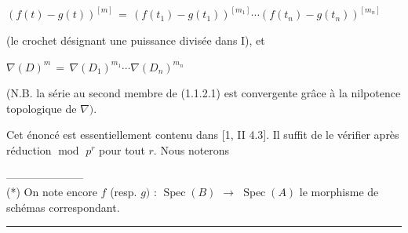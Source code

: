 \documentclass[9pt]{article}
\newcommand{\CanonText}[1]{\par{\fontsize{8.0}{9.35}\selectfont\RaggedRight #1\par}\vspace{2.2pt}}
\newcommand{\CanonDisplay}[1]{\par\vspace{1.2pt}\begin{center}{\fontsize{7.2}{8.4}\selectfont\(\displaystyle #1\)}\end{center}\vspace{1.2pt}}
\begin{document}
\begin{minipage}[t][\dimexpr\textheight-5pt\relax][t]{\textwidth}
\CanonDisplay{(f(t)-g(t))^{[m]}\,=\,(f(t_{1})-g(t_{1}))^{[m_{1}]}\cdots{}(f(t_{n})-g(t_{n}))^{[m_{n}]}}
\CanonText{(le crochet désignant une puissance divisée dans I), et}
\CanonDisplay{\nabla{}(D)^{m}\,=\,\nabla{}(D_{1})^{m_{1}}\cdots{}\nabla{}(D_{n})^{m_{n}}}
\CanonText{(N.B. la série au second membre de (1.1.2.1) est convergente grâce à la nilpotence topologique de \(\nabla{})\).}
\CanonText{Cet énoncé est essentiellement contenu dans [1, II 4.3]. Il suffit de le vérifier après réduction \(\operatorname{mod}\) \(p^{r}\) pour tout \(r\). Nous noterons}
\CanonText{---------------------\\(*) On note encore \(f\) (resp. \(g)\) : \(\operatorname{Spec}(B)\) \(\to{}\) \(\operatorname{Spec}(A)\) le morphisme de schémas correspondant.}
\vfill
{\color{Accent}\hrule height 0.35pt}\vspace{3pt}
\end{minipage}
\newpage
\end{document}
